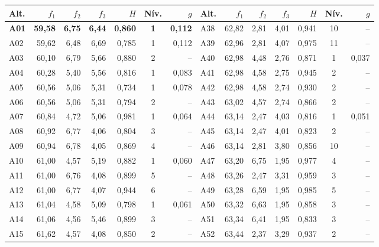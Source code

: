 \begin{tabular}{l r r r r c r @{\hspace{1.2em}} l r r r r c r}
\toprule
\textbf{Alt.} & \textbf{$f_1$} & \textbf{$f_2$} & \textbf{$f_3$} & \textbf{$H$} & \textbf{Nív.} & \textbf{$g$} & \textbf{Alt.} & \textbf{$f_1$} & \textbf{$f_2$} & \textbf{$f_3$} & \textbf{$H$} & \textbf{Nív.} & \textbf{$g$} \\
\midrule
\textbf{A01} & \textbf{59{,}58} & \textbf{6{,}75} & \textbf{6{,}44} & \textbf{0{,}860} & \textbf{1} & \textbf{0{,}112} & A38 & 62{,}82 & 2{,}81 & 4{,}01 & 0{,}941 & 10 & -- \\
A02 & 59{,}62 & 6{,}48 & 6{,}69 & 0{,}785 & 1 & 0{,}112 & A39 & 62{,}96 & 2{,}81 & 4{,}07 & 0{,}975 & 11 & -- \\
A03 & 60{,}10 & 6{,}79 & 5{,}66 & 0{,}880 & 2 & -- & A40 & 62{,}98 & 4{,}48 & 2{,}76 & 0{,}871 & 1 & 0{,}037 \\
A04 & 60{,}28 & 5{,}40 & 5{,}56 & 0{,}816 & 1 & 0{,}083 & A41 & 62{,}98 & 4{,}58 & 2{,}75 & 0{,}945 & 2 & -- \\
A05 & 60{,}56 & 5{,}06 & 5{,}31 & 0{,}734 & 1 & 0{,}078 & A42 & 62{,}98 & 4{,}58 & 2{,}74 & 0{,}930 & 2 & -- \\
A06 & 60{,}56 & 5{,}06 & 5{,}31 & 0{,}794 & 2 & -- & A43 & 63{,}02 & 4{,}57 & 2{,}74 & 0{,}866 & 2 & -- \\
A07 & 60{,}84 & 4{,}72 & 5{,}06 & 0{,}981 & 1 & 0{,}064 & A44 & 63{,}14 & 2{,}47 & 4{,}03 & 0{,}816 & 1 & 0{,}051 \\
A08 & 60{,}92 & 6{,}77 & 4{,}06 & 0{,}804 & 3 & -- & A45 & 63{,}14 & 2{,}47 & 4{,}01 & 0{,}823 & 2 & -- \\
A09 & 60{,}94 & 6{,}78 & 4{,}05 & 0{,}869 & 4 & -- & A46 & 63{,}14 & 2{,}81 & 3{,}80 & 0{,}856 & 10 & -- \\
A10 & 61{,}00 & 4{,}57 & 5{,}19 & 0{,}882 & 1 & 0{,}060 & A47 & 63{,}20 & 6{,}75 & 1{,}95 & 0{,}977 & 4 & -- \\
A11 & 61{,}00 & 6{,}76 & 4{,}08 & 0{,}899 & 5 & -- & A48 & 63{,}26 & 2{,}47 & 3{,}31 & 0{,}959 & 3 & -- \\
A12 & 61{,}00 & 6{,}77 & 4{,}07 & 0{,}944 & 6 & -- & A49 & 63{,}28 & 6{,}59 & 1{,}95 & 0{,}985 & 5 & -- \\
A13 & 61{,}04 & 4{,}58 & 5{,}09 & 0{,}798 & 1 & 0{,}061 & A50 & 63{,}32 & 6{,}63 & 1{,}95 & 0{,}858 & 3 & -- \\
A14 & 61{,}06 & 4{,}56 & 5{,}46 & 0{,}899 & 3 & -- & A51 & 63{,}34 & 6{,}41 & 1{,}95 & 0{,}833 & 3 & -- \\
A15 & 61{,}62 & 4{,}57 & 4{,}08 & 0{,}850 & 2 & -- & A52 & 63{,}44 & 2{,}37 & 3{,}29 & 0{,}937 & 2 & -- \\

\end{tabular}
